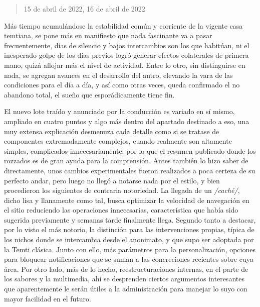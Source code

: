 \documentclass[
]{book}
\begin{document}
\begin{quote}
15 de abril de 2022, 16 de abril de 2022
\end{quote}

Más tiempo acumulándose la estabilidad común y corriente de la vigente casa temtiana, se pone más en manifiesto que nada fascinante va a pasar frecuentemente, días de silencio y bajos intercambios son los que habitúan, ni el inesperado golpe de los días previos logró generar efectos colaterales de primera mano, quizá aflojar más el nivel de actividad. Entre lo otro, sin distinguirse en nada, se agregan avances en el desarrollo del antro, elevando la vara de las condiciones para el día a día, y así como otras veces, queda confirmado el no abandono total, el sueño que esporádicamente tiene fin.

El nuevo lote traído y anunciado por la conducción es variado en sí mismo, ampliado en cuatro puntos y algo más dentro del apartado destinado a eso, una muy extensa explicación desmenuza cada detalle como si se tratase de componentes extremadamente complejos, cuando realmente son altamente simples, complicados innecesariamente, por lo que el resumen publicado donde los rozzados es de gran ayuda para la comprensión. Antes también lo hizo saber de directamente, unos cambios experimentales fueron realizados a poca certeza de su perfecto andar, pero luego no llegó a notarse nada por el estilo, y bien procedieron los siguientes de contraria notoriedad. La llegada de un \emph{/caché/}, dicho lisa y llanamente como tal, busca optimizar la velocidad de navegación en el sitio reduciendo las operaciones innecesarias, característica que había sido sugerida previamente y semanas tarde finalmente llega. Segundo tanto a destacar, por lo visto el más notorio, la distinción para las intervenciones propias, típica de los nichos donde se intercambia desde el anonimato, y que supo ser adoptada por la Temti clásica. Junto con ello, más parámetros para la personalización, opciones para bloquear notificaciones que se suman a las concreciones recientes sobre cuya área. Por otro lado, más de lo hecho, reestructuraciones internas, en el parte de los sabores y la multimedia, ahí se desprenden ciertos argumentos interesantes que aparentemente le serán útiles a la administración para manejar lo suyo con mayor facilidad en el futuro.
\end{document}
